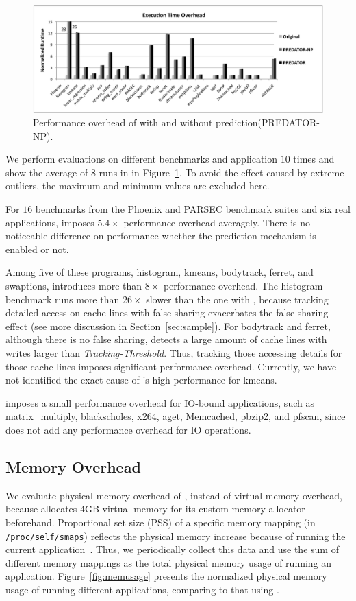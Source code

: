 \begin{figure}[!t]
\centering
\includegraphics[width=6in]{predator/figure/perf}
\caption{
Performance overhead of \Predator{} with and without prediction(PREDATOR-NP).
\label{fig:perf}}
\end{figure}
We perform evaluations on different benchmarks and application $10$ times and show the average of $8$ runs in in Figure~\ref{fig:perf}. To avoid the effect caused by extreme outliers, the maximum and minimum values are excluded here. 

For $16$ benchmarks from the Phoenix and PARSEC benchmark suites and six real applications, \Predator{} imposes $5.4\times$ performance overhead averagely. There is no noticeable difference on performance whether the prediction mechanism is enabled or not. 
 
Among five of these programs, histogram, kmeans, bodytrack, ferret, and swaptions, \predator{} introduces more than $8\times$ performance overhead. The histogram benchmark runs more than $26\times$ slower than the one with \pthreads{}, because tracking detailed access on cache lines with false sharing exacerbates the false sharing effect (see more discussion in Section~\ref{sec:sample}).  For bodytrack and ferret, although there is no false sharing, \Predator{} detects a large amount of cache lines with writes larger than {\it Tracking-Threshold}. Thus, tracking those accessing details for those cache lines imposes significant performance overhead. Currently, we have not identified the exact cause of \Predator{}'s high performance for kmeans.
   
\Predator{} imposes a small performance overhead for IO-bound applications, such as matrix\_multiply, blackscholes, x264, aget, Memcached, pbzip2, and pfscan, since \Predator{} does not add any performance overhead for IO operations.  

\subsection{Memory Overhead}
\label{sec:memoverhead}
We evaluate physical memory overhead of \Predator{}, instead of virtual memory overhead, because \Predator{} allocates 4GB virtual memory for its custom memory allocator beforehand. Proportional set size (PSS) of a specific memory mapping (in \texttt{/proc/self/smaps}) reflects the physical memory increase because of running the current application~\cite{memusage}. Thus, we periodically collect this data and use the sum of different memory mappings as the total physical memory usage of running an application. Figure~\ref{fig:memusage} presents the normalized physical memory usage of running different applications, comparing to that using \pthreads{}. 

